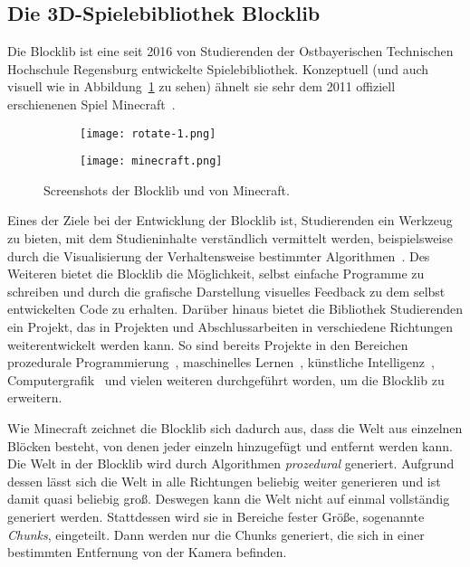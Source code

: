 \subsection{Die 3D-Spielebibliothek Blocklib}
Die Blocklib ist eine seit 2016 von Studierenden der Ostbayerischen Technischen Hochschule Regensburg entwickelte Spielebibliothek. Konzeptuell (und auch visuell wie in Abbildung~\ref{fig:blocklibminecraft} zu sehen) ähnelt sie sehr dem 2011 offiziell erschienenen Spiel Minecraft~\cite{Mojang}.
\begin{figure}[!htbp]
	\begin{subfigure}[b]{.49\textwidth}
		\texttt{[image: rotate-1.png]}
	\end{subfigure}
	\begin{subfigure}[b]{.49\textwidth}
		\texttt{[image: minecraft.png]}
	\end{subfigure}
	\caption{Screenshots der Blocklib und von Minecraft.}\label{fig:blocklibminecraft}
\end{figure}
Eines der Ziele bei der Entwicklung der Blocklib ist, Studierenden ein Werkzeug zu bieten, mit dem Studieninhalte verständlich vermittelt werden,  beispielsweise durch die Visualisierung der Verhaltensweise bestimmter Algorithmen~\cite{Helgert2018}. Des Weiteren bietet die Blocklib die Möglichkeit, selbst einfache Programme zu schreiben und durch die grafische Darstellung visuelles Feedback zu dem selbst entwickelten Code zu erhalten. Darüber hinaus bietet die Bibliothek Studierenden ein Projekt, das in Projekten und Abschlussarbeiten in verschiedene Richtungen weiterentwickelt werden kann. So sind bereits Projekte in den Bereichen prozedurale Programmierung~\cite{Beer2017,Ebbinger2018a,Kalle2018,Sellner2020,Kohler2021}, maschinelles Lernen~\cite{Mayer2021}, künstliche Intelligenz~\cite{Amthor2017,Weidner2018,Bunke2021,Mayer2021}, Computergrafik~\cite{Zink2016,Ebbinger2018,Werner2018} und vielen weiteren durchgeführt worden, um die Blocklib zu erweitern.

Wie Minecraft zeichnet die Blocklib sich dadurch aus, dass die Welt aus einzelnen Blöcken besteht, von denen jeder einzeln hinzugefügt und entfernt werden kann. Die Welt in der Blocklib wird durch Algorithmen \emph{prozedural} generiert. Aufgrund dessen lässt sich die Welt in alle Richtungen beliebig weiter generieren und ist damit quasi beliebig groß. Deswegen kann die Welt nicht auf einmal vollständig generiert werden. Stattdessen wird sie in Bereiche fester Größe, sogenannte \emph{Chunks}, eingeteilt. Dann werden nur die Chunks generiert, die sich in einer bestimmten Entfernung von der Kamera befinden.

